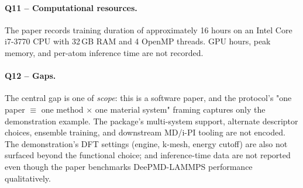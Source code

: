 \paragraph{Q11 -- Computational resources.}
The paper records training duration of approximately 16 hours on an
Intel Core i7-3770 CPU with 32\,GB RAM and 4 OpenMP threads. GPU
hours, peak memory, and per-atom inference time are not recorded.


\paragraph{Q12 -- Gaps.}
The central gap is one of \emph{scope}: this is a software paper,
and the protocol's "one paper $\equiv$ one method $\times$ one material
system" framing captures only the demonstration example. The
package's multi-system support, alternate descriptor choices,
ensemble training, and downstream MD/i-PI tooling are not encoded.
The demonstration's DFT settings (engine, k-mesh, energy cutoff) are
also not surfaced beyond the functional choice; and inference-time
data are not reported even though the paper benchmarks DeePMD-LAMMPS
performance qualitatively.
